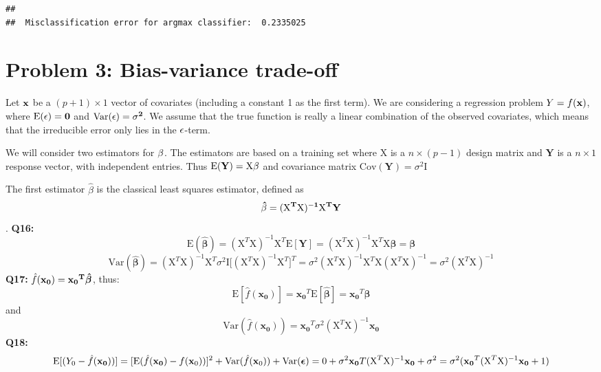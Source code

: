 \documentclass[]{article}
\begin{document}
\begin{verbatim}
## 
##  Misclassification error for argmax classifier:  0.2335025
\end{verbatim}

\section{Problem 3: Bias-variance
trade-off}\label{problem-3-bias-variance-trade-off}

Let \(\bf{x}\) be a \((p+1) \times 1\) vector of covariates (including a
constant 1 as the first term). We are considering a regression problem
\(Y = f(\bf{x})\), where \(\text{E}(\bf{\epsilon}) = 0\) and
\(\text{Var}(\bf{\epsilon}) = \sigma^2\). We assume that the true
function is really a linear combination of the observed covariates,
which means that the irreducible error only lies in the
\(\bf{\epsilon}\)-term.

We will consider two estimators for \(\bf{\beta}\). The estimators are
based on a training set where \(\text{X}\) is a \(n\times (p-1)\) design
matrix and \(\textbf{Y}\) is a \(n \times 1\) response vector, with
independent entries. Thus \(\text{E}(\textbf{Y})=\text{X}\bf{\beta}\)
and covariance matrix \(\text{Cov}(\textbf{Y})=\sigma^2 \text{I}\)

The first estimator \(\hat{\beta}\) is the classical least squares
estimator, defined as
\[\bf{\hat{\beta}} = (\text{X}^T\text{X})^{-1}\text{X}^T\textbf{Y}\].
\textbf{Q16:}
\[\text{E}(\boldsymbol{\hat{\beta}}) = (\text{X}^T\text{X})^{-1}\text{X}^T\text{E}[\textbf{Y}] = (\text{X}^T\text{X})^{-1}\text{X}^T\text{X} \boldsymbol{\beta} = \boldsymbol{\beta}\]
\[\text{Var}(\boldsymbol{\hat{\beta}}) = (\text{X}^T\text{X})^{-1}\text{X}^T \sigma^2 \text{I} \big[ (\text{X}^T\text{X})^{-1}\text{X}^T\big]^T = \sigma^2 (\text{X}^T\text{X})^{-1}\text{X}^T\text{X}(\text{X}^T\text{X})^{-1} = \sigma^2 (\text{X}^T\text{X})^{-1}\]
\textbf{Q17:}
\(\hat{f}(\mathbf{x_0}) = \bf{x_0}^T\boldsymbol{\hat{\beta}}\), thus:
\[\text{E}[\hat{f}(\mathbf{x_0})] = \mathbf{x_0}^T \text{E}[\boldsymbol{\hat{\beta}}] = \mathbf{x_0}^T \boldsymbol{\beta}\]
and
\[\text{Var}(\hat{f}(\mathbf{x_0})) = \mathbf{x_0}^T\sigma^2(\text{X}^T\text{X})^{-1}\mathbf{x_0}\]
\textbf{Q18:}
\[\text{E}[(Y_0-\hat{f}(\mathbf{x_0}))]=[\text{E}(\hat{f}(\mathbf{x_0})-f(\mathbf{x}_0))]^2+\text{Var}(\hat{f}(\mathbf{x}_0) ) + \text{Var}(\boldsymbol{\epsilon}) = 0 + \sigma^2\mathbf{x_0}T(\text{X}^T\text{X})^{-1}\mathbf{x_0} + \sigma^2 \\
= \sigma^2(\mathbf{x_0}^T(\text{X}^T\text{X})^{-1}\mathbf{x_0} + 1)\]
\end{document}
